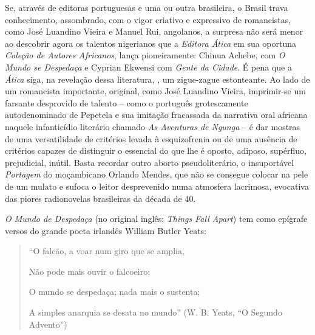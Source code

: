 \documentclass[
  letterpaper,
  DIV=11,
  numbers=noendperiod]{scrreprt}
\begin{document}
Se, através de editoras portuguesas e uma ou outra brasileira, o Brasil
trava conhecimento, assombrado, com o vigor criativo e expressivo de
romancistas, como José Luandino Vieira e Manuel Rui, angolanos, a
surpresa não será menor ao descobrir agora os talentos nigerianos que a
\emph{Editora Ática} em sua oportuna \emph{Coleção de Autores
Africanos}, lança pioneiramente: Chinua Achebe, com \emph{O Mundo se
Despedaça} e Cyprian Ekwensi com \emph{Gente da Cidade}. É pena que a
\emph{Ática} siga, na revelação dessa literatura, , um zigue-zague
estonteante. Ao lado de um romancista importante, original, como José
Luandino Vieira, imprimir-se um farsante desprovido de talento -- como o
português grotescamente autodenominado de Pepetela e sua imitação
fracassada da narrativa oral africana naquele infanticídio literário
chamado \emph{As Aventuras de Ngunga} -- é dar mostras de uma
versatilidade de critérios levada à esquizofrenia ou de uma ausência de
critérios capazes de distinguir o essencial do que lhe é oposto,
adiposo, supérfluo, prejudicial, inútil. Basta recordar outro aborto
pseudoliterário, o insuportável \emph{Portagem} do moçambicano Orlando
Mendes, que não se consegue colocar na pele de um mulato e sufoca o
leitor desprevenido numa atmosfera lacrimosa, evocativa das piores
radionovelas brasileiras da década de 40.

\emph{O Mundo de Despedaça} (no original inglês: \emph{Things Fall
Apart}) tem como epígrafe versos do grande poeta irlandês William Butler
Yeats:

\begin{quote}
``O falcão, a voar num giro que se amplia,~

Não pode mais ouvir o falcoeiro;~

O mundo se despedaça; nada mais o sustenta;~

A simples anarquia se desata no mundo'' (W. B. Yeats, ``O Segundo
Advento'')
\end{quote}
\end{document}
